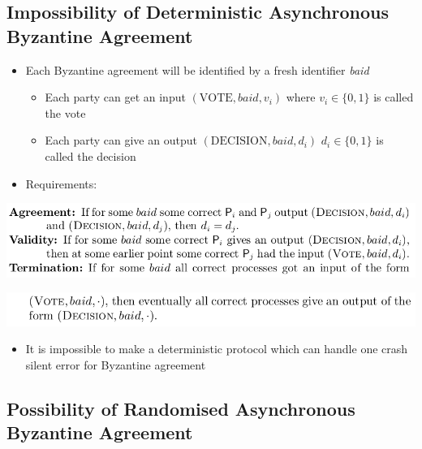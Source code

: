 \documentclass[11pt]{article}
\begin{document}
\subsection{Impossibility of Deterministic Asynchronous Byzantine Agreement}
\label{sec:orgdafc73c}
\begin{itemize}
\item Each Byzantine agreement will be identified by a fresh identifier \emph{baid}
\begin{itemize}
\item Each party can get an input \((\text{VOTE}, baid, v_i)\) where \(v_i \in \{0,1\}\) is called the vote
\item Each party can give an output \((\text{DECISION}, baid,d_i)\) \(d_i \in \{0,1\}\) is called the decision
\end{itemize}

\item Requirements:
\end{itemize}
\begin{center}
\includegraphics[width=.9\linewidth]{Asynchronous Agreement (8)/screenshot_2018-09-29_17-26-26.png}
\end{center}
\begin{center}
\includegraphics[width=.9\linewidth]{Asynchronous Agreement (8)/screenshot_2018-09-29_17-26-49.png}
\end{center}
\begin{itemize}
\item It is impossible to make a deterministic protocol which can handle one crash silent error for Byzantine agreement
\end{itemize}

\subsection{Possibility of Randomised Asynchronous Byzantine Agreement}
\label{sec:org46c1ae6}
\end{document}
